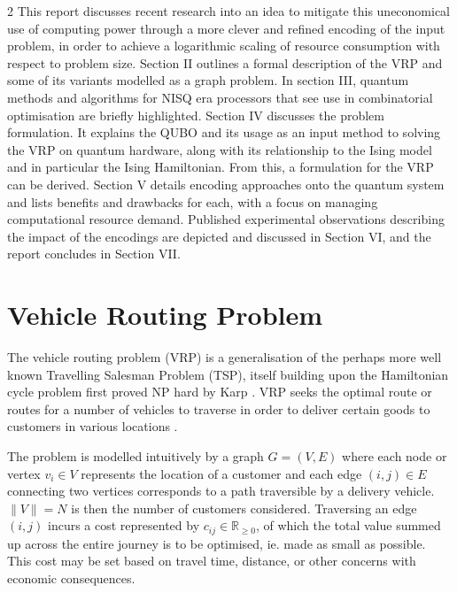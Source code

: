 \documentclass [10pt]{article}
\newcommand {\qnorm}[1] {\lVert #1 \rVert}
\begin{document}
\begin {multicols}{2}
This report discusses recent research into an idea to mitigate this
uneconomical use of computing power through a more clever and refined 
encoding of the input problem, in order to achieve a logarithmic scaling of
resource consumption with respect to problem size.
Section II outlines a formal description of the VRP and some of its variants
modelled as a graph problem.
In section III, quantum methods and algorithms for NISQ era processors that
see use in combinatorial optimisation are briefly highlighted.
Section IV discusses the problem formulation. It explains the QUBO and
its usage as an input method to solving the VRP on quantum hardware, along
with its relationship to the Ising model and in particular the
Ising Hamiltonian. From this, a formulation for the VRP can be derived.
Section V details encoding approaches onto the quantum system and lists
benefits and drawbacks for each, with a focus on managing computational
resource demand.
Published experimental observations describing the impact of the encodings
are depicted and discussed in Section VI,
and the report concludes in Section VII.

\section {Vehicle Routing Problem}
The vehicle routing problem (VRP) is a generalisation of the perhaps more
well known Travelling Salesman Problem (TSP), itself building upon the
Hamiltonian cycle problem first proved NP hard by Karp \cite{karp21}. VRP seeks
the optimal route or routes for a number of vehicles to traverse in order to
deliver certain goods to customers in various locations \cite{vrpintro}.

The problem is modelled intuitively by a graph $G = (V, E)$
where each node or vertex $v_i \in V$ represents the location of a customer 
and each edge $(i, j) \in E$ connecting two vertices corresponds to a path
traversible by a delivery vehicle. $\qnorm{V} = N$ is then the number
of customers considered. Traversing an edge $(i, j)$ incurs
a cost represented by $c_{ij} \in \mathbb R_{\ge 0}$, of which the total
value summed up across the entire journey is to be optimised, ie. made as
small as possible. This cost may be set based on travel time, distance,
or other concerns with economic consequences.


\end{multicols}
\end{document}
